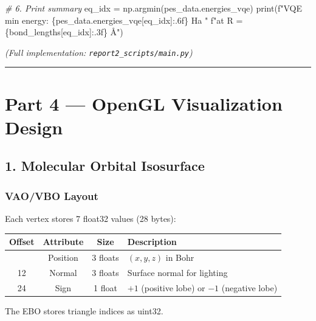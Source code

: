 \documentclass[
  11pt,
]{report}
\newenvironment{Shaded}{}{}
\newcommand{\BuiltInTok}[1]{\textcolor[rgb]{0.00,0.50,0.00}{#1}}
\newcommand{\CommentTok}[1]{\textcolor[rgb]{0.38,0.63,0.69}{\textit{#1}}}
\newcommand{\NormalTok}[1]{#1}
\newcommand{\OperatorTok}[1]{\textcolor[rgb]{0.40,0.40,0.40}{#1}}
\newcommand{\SpecialCharTok}[1]{\textcolor[rgb]{0.25,0.44,0.63}{#1}}
\newcommand{\SpecialStringTok}[1]{\textcolor[rgb]{0.73,0.40,0.53}{#1}}
\newcounter{none} %
\begin{document}
\begin{Shaded}
\begin{Highlighting}[]
    \CommentTok{\# 6. Print summary}
\NormalTok{    eq\_idx }\OperatorTok{=}\NormalTok{ np.argmin(pes\_data.energies\_vqe)}
    \BuiltInTok{print}\NormalTok{(}\SpecialStringTok{f"VQE min energy: }\SpecialCharTok{\{}\NormalTok{pes\_data}\SpecialCharTok{.}\NormalTok{energies\_vqe[eq\_idx]}\SpecialCharTok{:.6f\}}\SpecialStringTok{ Ha "}
          \SpecialStringTok{f"at R = }\SpecialCharTok{\{}\NormalTok{bond\_lengths[eq\_idx]}\SpecialCharTok{:.3f\}}\SpecialStringTok{ Å"}\NormalTok{)}
\end{Highlighting}
\end{Shaded}

\emph{(Full implementation: \texttt{report2\_scripts/main.py})}

\begin{center}\rule{0.5\linewidth}{0.5pt}\end{center}

\section{Part 4 --- OpenGL Visualization
Design}\label{part-4-opengl-visualization-design}

\subsection{1. Molecular Orbital
Isosurface}\label{molecular-orbital-isosurface}

\subsubsection{VAO/VBO Layout}\label{vaovbo-layout}

Each vertex stores 7 float32 values (28 bytes):

{\def\LTcaptype{none} %
\begin{longtable}[]{@{}cccl@{}}
\toprule\noalign{}
Offset & Attribute & Size & Description \\
\midrule\noalign{}
\endhead
\bottomrule\noalign{}
\endlastfoot
0 & Position & 3 floats & \((x, y, z)\) in Bohr \\
12 & Normal & 3 floats & Surface normal for lighting \\
24 & Sign & 1 float & \(+1\) (positive lobe) or \(-1\) (negative
lobe) \\
\end{longtable}
}

The EBO stores triangle indices as uint32.
\end{document}
